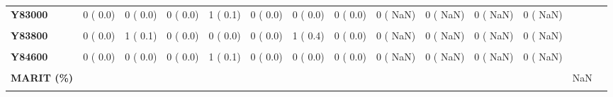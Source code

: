 \documentclass[
]{article}
\begin{document}
\begin{table}[H]
\begin{tabular}[t]{>{\raggedright\arraybackslash}p{5em}ccccccccccccc}
\textbf{Y83000} & 0 (  0.0) & 0 (  0.0) & 0 (  0.0) & 1 (  0.1) & 0 (  0.0) & 0 (  0.0) & 0 (  0.0) & 0 (  NaN) & 0 (  NaN) & 0 (  NaN) & 0 (  NaN) &  & \\
\textbf{\cellcolor{gray!10}{Y83100}} & \cellcolor{gray!10}{0 (  0.0)} & \cellcolor{gray!10}{0 (  0.0)} & \cellcolor{gray!10}{1 (  0.1)} & \cellcolor{gray!10}{0 (  0.0)} & \cellcolor{gray!10}{1 (  0.2)} & \cellcolor{gray!10}{0 (  0.0)} & \cellcolor{gray!10}{0 (  0.0)} & \cellcolor{gray!10}{0 (  NaN)} & \cellcolor{gray!10}{0 (  NaN)} & \cellcolor{gray!10}{0 (  NaN)} & \cellcolor{gray!10}{0 (  NaN)} & \cellcolor{gray!10}{} & \cellcolor{gray!10}{}\\
\textbf{Y83800} & 0 (  0.0) & 1 (  0.1) & 0 (  0.0) & 0 (  0.0) & 0 (  0.0) & 1 (  0.4) & 0 (  0.0) & 0 (  NaN) & 0 (  NaN) & 0 (  NaN) & 0 (  NaN) &  & \\
\textbf{\cellcolor{gray!10}{Y83900}} & \cellcolor{gray!10}{0 (  0.0)} & \cellcolor{gray!10}{0 (  0.0)} & \cellcolor{gray!10}{0 (  0.0)} & \cellcolor{gray!10}{0 (  0.0)} & \cellcolor{gray!10}{1 (  0.2)} & \cellcolor{gray!10}{0 (  0.0)} & \cellcolor{gray!10}{0 (  0.0)} & \cellcolor{gray!10}{0 (  NaN)} & \cellcolor{gray!10}{0 (  NaN)} & \cellcolor{gray!10}{0 (  NaN)} & \cellcolor{gray!10}{0 (  NaN)} & \cellcolor{gray!10}{} & \cellcolor{gray!10}{}\\
\textbf{Y84600} & 0 (  0.0) & 0 (  0.0) & 0 (  0.0) & 1 (  0.1) & 0 (  0.0) & 0 (  0.0) & 0 (  0.0) & 0 (  NaN) & 0 (  NaN) & 0 (  NaN) & 0 (  NaN) &  & \\
\textbf{\cellcolor{gray!10}{MAJOR\_30D = YES (\%)}} & \cellcolor{gray!10}{0 (  NaN)} & \cellcolor{gray!10}{0 (  NaN)} & \cellcolor{gray!10}{0 (  NaN)} & \cellcolor{gray!10}{0 (  NaN)} & \cellcolor{gray!10}{0 (  NaN)} & \cellcolor{gray!10}{0 (  NaN)} & \cellcolor{gray!10}{0 (  NaN)} & \cellcolor{gray!10}{14 (  0.8)} & \cellcolor{gray!10}{50 (  3.4)} & \cellcolor{gray!10}{41 (  2.7)} & \cellcolor{gray!10}{16 (  1.4)} & \cellcolor{gray!10}{NaN} & \cellcolor{gray!10}{}\\
\textbf{MARIT (\%)} &  &  &  &  &  &  &  &  &  &  &  & NaN & \\
\textbf{\cellcolor{gray!10}{DIVORCED}} & \cellcolor{gray!10}{0 (  NaN)} & \cellcolor{gray!10}{0 (  NaN)} & \cellcolor{gray!10}{102 (  5.1)} & \cellcolor{gray!10}{0 (  NaN)} & \cellcolor{gray!10}{0 (  NaN)} & \cellcolor{gray!10}{167 (  9.5)} & \cellcolor{gray!10}{149 (  8.2)} & \cellcolor{gray!10}{142 (  8.6)} & \cellcolor{gray!10}{154 (  9.3)} & \cellcolor{gray!10}{169 ( 10.0)} & \cellcolor{gray!10}{160 (  9.9)} & \cellcolor{gray!10}{} & \cellcolor{gray!10}{}\\

\end{tabular}
\end{table}
\end{document}
